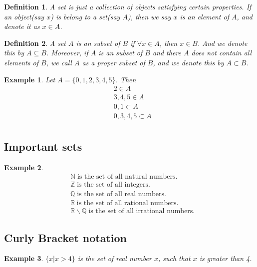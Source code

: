\documentclass{article}
\newtheorem{definition}{Definition}
\newtheorem{ex}{Example}
\begin{document}
\begin{definition}
	A set is just a collection of objects satisfying certain properties. If an object(say $x$) is belong to a set(say $A$), then we say $x$ is an element of $A$, and denote it as $x\in A$. 
\end{definition}

\begin{definition}
	A set $A$ is an subset of $B$ if $\forall x\in A$, then $x\in B$. And we denote this by $A\subseteq B$. Moreover, if $A$ is an subset of $B$ and there $A$ does not contain all elements of $B$, we call $A$ as a proper subset of $B$, and we denote this by $A\subset B$. 
\end{definition}

\begin{ex}
	Let $A=\{ 0,1,2,{3,4,5} \}$. Then 
	\begin{align*}
	&2\in A\\
	&{3,4,5}\in A\\
	&{0,1} \subset A\\
	&{0,{3,4,5}} \subset A\\
	\end{align*}
\end{ex}


\subsection*{Important sets}
\begin{ex}
	\begin{align*}
	&\mathbb{N}\; \text{is the set of all natural numbers.}\\
	&\mathbb{Z}\; \text{is the set of all integers.}\\
	&\mathbb{Q}\; \text{is the set of all real numbers.}\\
	&\mathbb{R}\; \text{is the set of all rational numbers.}\\
	&\mathbb{R}\backslash \mathbb{Q}\; \text{is the set of all irrational numbers.}
	\end{align*}
\end{ex}

\subsection*{Curly Bracket notation}
\begin{ex}
	$ \{x|x>4\} $ is the set of real number $x$, such that $x$ is greater than 4.
\end{ex}
\end{document}
